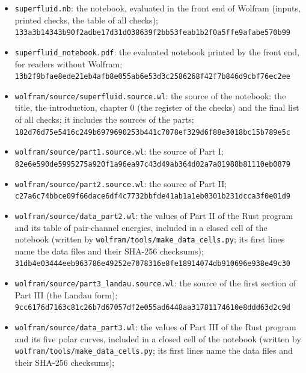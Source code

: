 \documentclass[
  10pt,
]{article}
\providecommand{\tightlist}{%
  \setlength{\itemsep}{0pt}\setlength{\parskip}{0pt}}
\begin{document}
\begin{itemize}
\tightlist
\item
  \texttt{superfluid.nb}: the notebook, evaluated in the front end of
  Wolfram (inputs, printed checks, the table of all checks);\\
  \texttt{133a3b14343b90f2adbe17d31d038639f2bb53feab1b2f0a5ffe9afabe570b99}
\item
  \texttt{superfluid\_notebook.pdf}: the evaluated notebook printed by
  the front end, for readers without Wolfram;\\
  \texttt{13b2f9bfae8ede21eb4afb8e055ab6e53d3c2586268f42f7b846d9cbf76ec2ee}
\item
  \texttt{wolfram/source/superfluid.source.wl}: the source of the
  notebook: the title, the introduction, chapter 0 (the register of the
  checks) and the final list of all checks; it includes the sources of
  the parts;\\
  \texttt{182d76d75e5416c249b6979690253b441c7078ef329d6f88e3018bc15b789e5c}
\item
  \texttt{wolfram/source/part1.source.wl}: the source of Part I;\\
  \texttt{82e6e590de5995275a920f1a96ea97c43d49ab364d02a7a01988b81110eb0879}
\item
  \texttt{wolfram/source/part2.source.wl}: the source of Part II;\\
  \texttt{c27a6c74bbce09f66dace6df4c7732bbfde41ab1a1eb0301b231dcca3f0e01d9}
\item
  \texttt{wolfram/source/data\_part2.wl}: the values of Part II of the
  Rust program and its table of pair-channel energies, included in a
  closed cell of the notebook (written by
  \texttt{wolfram/tools/make\_data\_cells.py}; its first lines name the
  data files and their SHA-256 checksums);\\
  \texttt{31db4e03444eeb963786e49252e7078316e8fe18914074db910696e938e49c30}
\item
  \texttt{wolfram/source/part3\_landau.source.wl}: the source of the
  first section of Part III (the Landau form);\\
  \texttt{9cc6176d7163c81c26b7d67057df2e055ad6448aa31781174610e8ddd63d2c9d}
\item
  \texttt{wolfram/source/data\_part3.wl}: the values of Part III of the
  Rust program and its five polar curves, included in a closed cell of
  the notebook (written by \texttt{wolfram/tools/make\_data\_cells.py};
  its first lines name the data files and their SHA-256 checksums);\\

\end{itemize}
\end{document}
